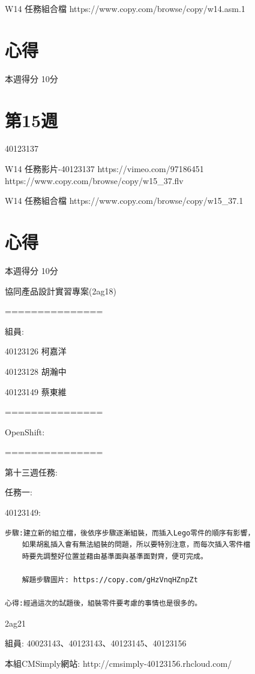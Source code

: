 \documentclass[]{article}
\begin{document}
W14 任務組合檔 https://www.copy.com/browse/copy/w14.asm.1

\section{心得}\label{ux5fc3ux5f97-2}

本週得分 10分

\section{第15週}\label{ux7b2c15ux9031}

40123137

W14 任務影片-40123137 https://vimeo.com/97186451
https://www.copy.com/browse/copy/w15\_37.flv

W14 任務組合檔 https://www.copy.com/browse/copy/w15\_37.1

\section{心得}\label{ux5fc3ux5f97-3}

本週得分 10分

協同產品設計實習專案(2ag18)

===============

組員:

40123126 柯嘉洋

40123128 胡瀚中

40123149 蔡東維

===============

OpenShift:

===============

第十三週任務:

任務一:

40123149:

\begin{verbatim}
步驟:建立新的組立檔，後依序步驟逐漸組裝，而插入Lego零件的順序有影響，
    如果胡亂插入會有無法組裝的問題，所以要特別注意，而每次插入零件檔
    時要先調整好位置並藉由基準面與基準面對齊，便可完成。

    解題步驟圖片: https://copy.com/gHzVnqHZnpZt
    
心得:經過這次的試題後，組裝零件要考慮的事情也是很多的。
\end{verbatim}

2ag21

組員: 40023143、40123143、40123145、40123156

本組CMSimply網站: http://cmsimply-40123156.rhcloud.com/
\end{document}
